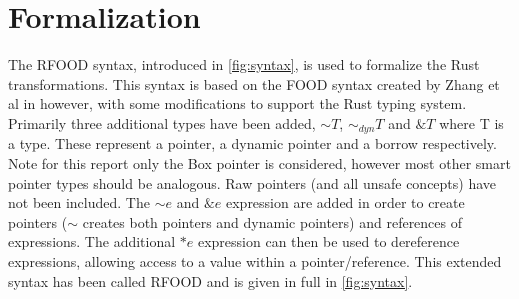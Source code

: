 \documentclass[ oneside,%
                    author={James Elgar},
                    degree={MEng},
                     title={Bidirectional transformer between functional and \\ object-oriented programming in Rust},
                  subtitle={}]{dissertation}
\newcommand{\weixin}{Zhang et al }
\begin{document}



\section{Formalization}

The RFOOD syntax, introduced in \autoref{fig:syntax}, is used to formalize the Rust transformations. This syntax is based on the FOOD syntax created by \weixin in \cite{food} however, with some modifications to support the Rust typing system. Primarily three additional types have been added, $\sim T$, $\sim_{dyn} T$ and $\& T$ where T is a type. These represent a pointer, a dynamic pointer and a borrow respectively. Note for this report only the Box pointer is considered, however most other smart pointer types should be analogous. Raw pointers (and all unsafe concepts) have not been included. The $\sim e$ and $\& e$ expression are added in order to create pointers ($\sim$ creates both pointers and dynamic pointers) and references of expressions. The additional $*e$ expression can then be used to dereference expressions, allowing access to a value within a pointer/reference. This extended syntax has been called RFOOD and is given in full in \autoref{fig:syntax}. 

\end{document}
